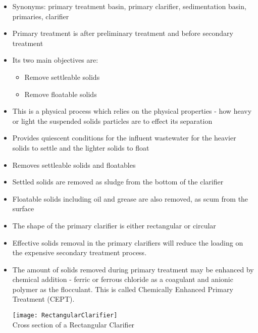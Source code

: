 \begin{itemize}
\item Synonyms:  primary treatment basin, primary clarifier, sedimentation basin, primaries, clarifier

	
		\item Primary treatment is after preliminary treatment and 				before secondary treatment
		\item Its two main objectives are: 
			\begin{itemize}
				\item Remove settleable solids
				\item Remove floatable solids
			\end{itemize}
		\item This is a physical process which relies on the physical 			properties - how heavy or light the suspended solids particles 		are to effect its separation
		\item Provides quiescent conditions for the influent 					wastewater for the heavier solids to settle and the lighter 			solids to float
		\item Removes settleable solids and floatables
		\item Settled solids are removed as sludge from the bottom of 			the clarifier
		\item Floatable solids including oil and grease are also 				removed, as scum from the surface\\
		\item The shape of the primary clarifier is either rectangular 		or circular
	
		\item Effective solids removal in the primary clarifiers will 			reduce the loading on the expensive secondary treatment 				process.
		\item The amount of solids removed during primary treatment 			may be enhanced by chemical addition - ferric or ferrous 				chloride as a coagulant and anionic polymer as the flocculant.  		This is called Chemically Enhanced Primary Treatment (CEPT).

			\begin{center}
				\texttt{[image: RectangularClarifier]}\\
				Cross section of a Rectangular Clarifier\\


\end{center}
\end{itemize}

